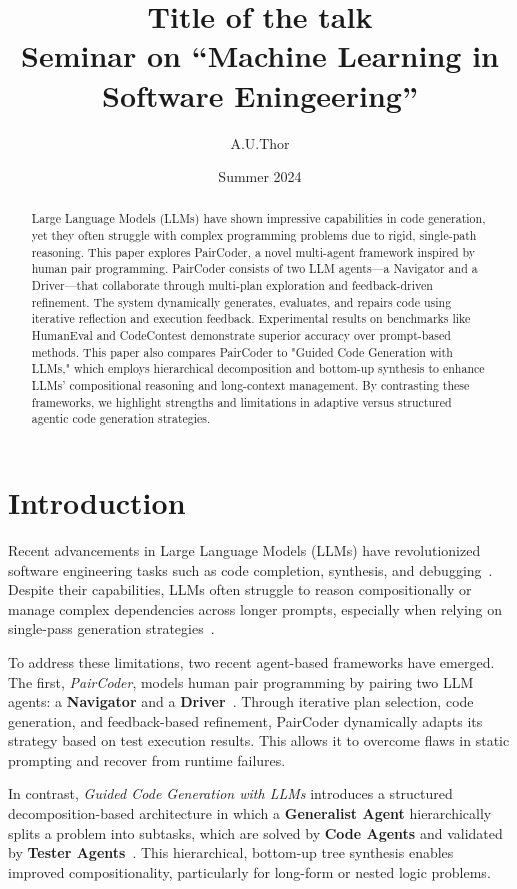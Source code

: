 \documentclass[11pt,a4paper]{article}
\title{Title of the talk \\[0.5em] \large{Seminar on ``Machine Learning in Software Eningeering'' \\[0.5em]} }
\author{A.U.Thor}
\date{Summer 2024}
\begin{document}
\maketitle

\begin{abstract}
Large Language Models (LLMs) have shown impressive capabilities in code generation, yet they often struggle with complex programming problems due to rigid, single-path reasoning. This paper explores PairCoder, a novel multi-agent framework inspired by human pair programming. PairCoder consists of two LLM agents—a Navigator and a Driver—that collaborate through multi-plan exploration and feedback-driven refinement. The system dynamically generates, evaluates, and repairs code using iterative reflection and execution feedback. Experimental results on benchmarks like HumanEval and CodeContest demonstrate superior accuracy over prompt-based methods. This paper also compares PairCoder to "Guided Code Generation with LLMs," which employs hierarchical decomposition and bottom-up synthesis to enhance LLMs’ compositional reasoning and long-context management. By contrasting these frameworks, we highlight strengths and limitations in adaptive versus structured agentic code generation strategies.
\end{abstract}

\newpage
\tableofcontents
\newpage

\section{Introduction}
Recent advancements in Large Language Models (LLMs) have revolutionized software engineering tasks such as code completion, synthesis, and debugging~\cite{zhang2024paircoder}. Despite their capabilities, LLMs often struggle to reason compositionally or manage complex dependencies across longer prompts, especially when relying on single-pass generation strategies~\cite{chen2024selfdebugging}.

To address these limitations, two recent agent-based frameworks have emerged. The first, \textit{PairCoder}, models human pair programming by pairing two LLM agents: a \textbf{Navigator} and a \textbf{Driver}~\cite{zhang2024paircoder}. Through iterative plan selection, code generation, and feedback-based refinement, PairCoder dynamically adapts its strategy based on test execution results. This allows it to overcome flaws in static prompting and recover from runtime failures.

In contrast, \textit{Guided Code Generation with LLMs} introduces a structured decomposition-based architecture in which a \textbf{Generalist Agent} hierarchically splits a problem into subtasks, which are solved by \textbf{Code Agents} and validated by \textbf{Tester Agents}~\cite{almorsi2025guided}. This hierarchical, bottom-up tree synthesis enables improved compositionality, particularly for long-form or nested logic problems.
\end{document}

